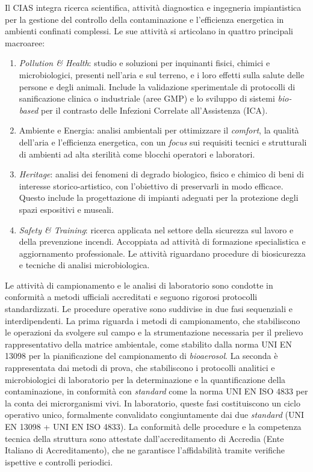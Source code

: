 Il CIAS integra ricerca scientifica, attività diagnostica e
ingegneria impiantistica per la gestione del controllo della contaminazione e
l’efficienza energetica in ambienti confinati complessi. Le sue attività si
articolano in quattro principali macroaree:
\begin{enumerate}\setlength{\itemsep}{0pt}\setlength{\parsep}{0pt}\setlength{\topsep}{0pt}\setlength{\partopsep}{0pt}
	\item \textit{Pollution \& Health}: studio e soluzioni per inquinanti fisici, chimici e microbiologici, presenti nell'aria e sul terreno, e i loro effetti sulla salute delle persone e degli animali. Include la validazione sperimentale di protocolli di sanificazione clinica o industriale (aree GMP) e lo sviluppo di sistemi \textit{bio-based} per il contrasto delle Infezioni Correlate all'Assistenza (ICA).
	\item Ambiente e Energia: analisi ambientali per ottimizzare il \textit{comfort}, la qualità dell'aria e l'efficienza energetica, con un \textit{focus} sui requisiti tecnici e strutturali di ambienti ad alta sterilità come blocchi operatori e laboratori.
	\item \textit{Heritage}: analisi dei fenomeni di degrado biologico, fisico e chimico di beni di interesse storico-artistico, con l'obiettivo di preservarli in modo efficace. Questo include la progettazione di impianti adeguati per la protezione degli spazi espositivi e museali.
	\item \textit{Safety \& Training}: ricerca applicata nel settore della sicurezza sul lavoro e della prevenzione incendi. Accoppiata ad attività di formazione specialistica e aggiornamento professionale. Le attività riguardano procedure di biosicurezza e tecniche di analisi microbiologica.
\end{enumerate}
Le attività di campionamento e le analisi di laboratorio sono condotte in conformità a metodi ufficiali accreditati e seguono rigorosi protocolli standardizzati. Le procedure operative sono suddivise in due fasi sequenziali e interdipendenti. La prima riguarda i metodi di campionamento, che stabiliscono le operazioni da svolgere sul campo e la strumentazione necessaria per il prelievo rappresentativo della matrice ambientale, come stabilito dalla norma UNI EN 13098 per la pianificazione del campionamento di \textit{bioaerosol}. La seconda è rappresentata dai metodi di prova, che stabiliscono i protocolli analitici e microbiologici di laboratorio per la determinazione e la quantificazione della contaminazione, in conformità con \textit{standard} come la norma UNI EN ISO 4833 per la conta dei microrganismi vivi. In laboratorio, queste fasi costituiscono un ciclo operativo unico, formalmente convalidato congiuntamente dai due \textit{standard} (UNI EN 13098 + UNI EN ISO 4833). La conformità delle procedure e la competenza tecnica della struttura sono attestate dall'accreditamento di Accredia (Ente Italiano di Accreditamento), che ne garantisce l'affidabilità tramite verifiche ispettive e controlli periodici.

